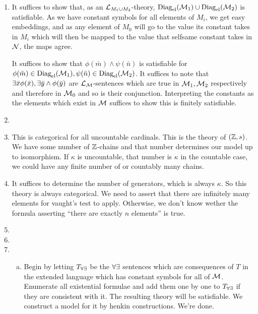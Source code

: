 \begin{enumerate}[1.]
\item It suffices to show that, as an \(\mathcal{L}_{M_1\cup M_2}\)-theory, \(\text{Diag}_\text{el}(\mathcal{M}_1) \cup \text{Diag}_\text{el}(\mathcal{M}_2)\) is satisfiable. As we have constant symbols for all elements of \(M_i\), we get easy embeddings, and as any element of \(M_0\) will go to the value its constant takes in \(M_i\) which will then be mapped to the value that selfsame constant takes in \(\mathcal{N}\), the maps agree. 

It suffices to show that \(\phi(\bar{m}) \land \psi(\bar{n})\) is satisfiable for \(\phi(\bar{m}) \in \text{Diag}_\text{el}(\mathcal{M}_1), \psi(\bar{n}) \in \text{Diag}_\text{el}(\mathcal{M}_2)\). It suffices to note that \(\exists \bar{x} \phi(\bar{x}),  \exists \bar{y} \land \phi(\bar{y})\) are \(\mathcal{L}_{\mathcal{M}}\)-sentences which are true in \(\mathcal{M}_1, \mathcal{M}_2\) respectively and therefore in \(\mathcal{M}_0\) and so is their conjunction. Interpreting the constants as the elements which exist in \(\mathcal{M}\) suffices to show this is finitely satisfiable.  

\item
 
\item This is categorical for all uncountable cardinals. This is the theory of \((\mathbb{Z}, s)\). We have some number of \(\mathbb{Z}\)-chains and that number determines our model up to isomorphism. If \(\kappa\) is uncountable, that number is \(\kappa\) in the countable case, we could have any finite number of or countably many chains. 
 
\item It suffices to determine the number of generators, which is always \(\kappa\). So this theory is always categorical. We need to assert that there are infinitely many elements for vaught's test to apply. Otherwise, we don't know wether the formula asserting ``there are exactly \(n\) elements'' is true. 
 
\item 

\item
 
\item 
  \begin{enumerate}[a)]
  \item Begin by letting \(T_{\forall\exists}\) be the \(\forall\exists\) sentences which are consequences of \(T\) in the extended language which has constant symbols for all of \(\mathcal{M}\). 
Enumerate all existential formulae and add them one by one to \(T_{\forall\exists}\) if they are consistent with it. 
The resulting theory will be satisfiable. 
We construct a model for it by henkin constructions. We're done. 


\end{enumerate}
\end{enumerate}
